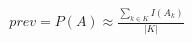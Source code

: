 \documentclass[a4paper, 12pt, twoside]{article}
\begin{document}
\begin{equation*}
\begin{aligned}
prev = P(A) \approx \frac{\sum_{k \in K}{I(A_k)}}{|K|}
\end{aligned}
\end{equation*}







\end{document}
